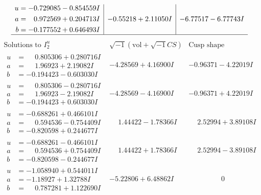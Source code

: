 \documentclass[1p]{elsarticle_modified}
\theoremstyle{definition}
\newcommand{\I}{\sqrt{-1}}
\begin{document}
$$\begin{array}{c|c|c}
\begin{aligned}
u &= -0.729085 - 0.854559 I \\
a &= \phantom{-}0.972569 + 0.204713 I \\
b &= -0.177552 + 0.646493 I\end{aligned}
 & -0.55218 + 2.11050 I & -6.77517 - 6.77743 I\\
 \hline 
 \end{array}$$\newpage$$\begin{array}{c|c|c}  
\text{Solutions to }I^u_{2}& \I (\text{vol} + \sqrt{-1}CS) & \text{Cusp shape}\\
 \hline 
\begin{aligned}
u &= \phantom{-}0.805306 + 0.280716 I \\
a &= \phantom{-}1.96923 + 2.19082 I \\
b &= -0.194423 - 0.603030 I\end{aligned}
 & -4.28569 + 4.16900 I & -0.96371 - 4.22019 I \\ \hline\begin{aligned}
u &= \phantom{-}0.805306 - 0.280716 I \\
a &= \phantom{-}1.96923 - 2.19082 I \\
b &= -0.194423 + 0.603030 I\end{aligned}
 & -4.28569 - 4.16900 I & -0.96371 + 4.22019 I \\ \hline\begin{aligned}
u &= -0.688261 + 0.466101 I \\
a &= \phantom{-}0.594536 - 0.754409 I \\
b &= -0.820598 + 0.244677 I\end{aligned}
 & \phantom{-}1.44422 - 1.78366 I & \phantom{-}2.52994 + 3.89108 I \\ \hline\begin{aligned}
u &= -0.688261 - 0.466101 I \\
a &= \phantom{-}0.594536 + 0.754409 I \\
b &= -0.820598 - 0.244677 I\end{aligned}
 & \phantom{-}1.44422 + 1.78366 I & \phantom{-}2.52994 - 3.89108 I \\ \hline\begin{aligned}
u &= -1.058940 + 0.544011 I \\
a &= -1.18927 + 1.32788 I \\
b &= \phantom{-}0.787281 + 1.122690 I\end{aligned}
 & -5.22806 + 6.48862 I & \phantom{-0.000000 } 0 \\ \hline\begin{aligned}

\end{aligned}
\end{array}$$
\end{document}
